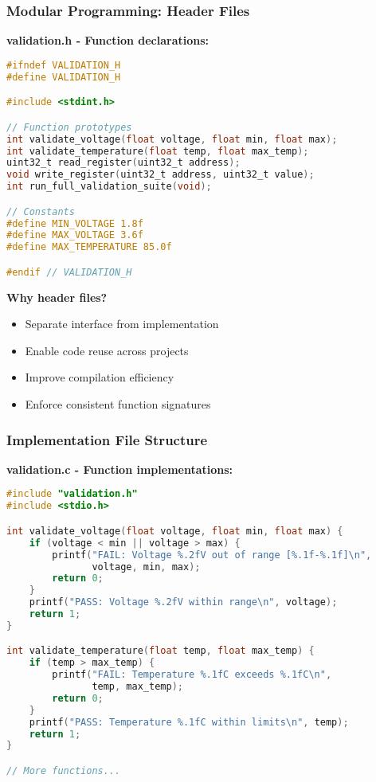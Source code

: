\documentclass{beamer}
\begin{document}
\begin{frame}[fragile]
\frametitle{Modular Programming: Header Files}
\textbf{validation.h - Function declarations:}
\begin{lstlisting}[language=C]
#ifndef VALIDATION_H
#define VALIDATION_H

#include <stdint.h>

// Function prototypes
int validate_voltage(float voltage, float min, float max);
int validate_temperature(float temp, float max_temp);
uint32_t read_register(uint32_t address);
void write_register(uint32_t address, uint32_t value);
int run_full_validation_suite(void);

// Constants
#define MIN_VOLTAGE 1.8f
#define MAX_VOLTAGE 3.6f
#define MAX_TEMPERATURE 85.0f

#endif // VALIDATION_H
\end{lstlisting}

\textbf{Why header files?}
\begin{itemize}
    \item Separate interface from implementation
    \item Enable code reuse across projects
    \item Improve compilation efficiency
    \item Enforce consistent function signatures
\end{itemize}
\end{frame}

\begin{frame}[fragile]
\frametitle{Implementation File Structure}
\textbf{validation.c - Function implementations:}
\begin{lstlisting}[language=C]
#include "validation.h"
#include <stdio.h>

int validate_voltage(float voltage, float min, float max) {
    if (voltage < min || voltage > max) {
        printf("FAIL: Voltage %.2fV out of range [%.1f-%.1f]\n",
               voltage, min, max);
        return 0;
    }
    printf("PASS: Voltage %.2fV within range\n", voltage);
    return 1;
}

int validate_temperature(float temp, float max_temp) {
    if (temp > max_temp) {
        printf("FAIL: Temperature %.1fC exceeds %.1fC\n",
               temp, max_temp);
        return 0;
    }
    printf("PASS: Temperature %.1fC within limits\n", temp);
    return 1;
}

// More functions...
\end{lstlisting}
\end{frame}
\end{document}
